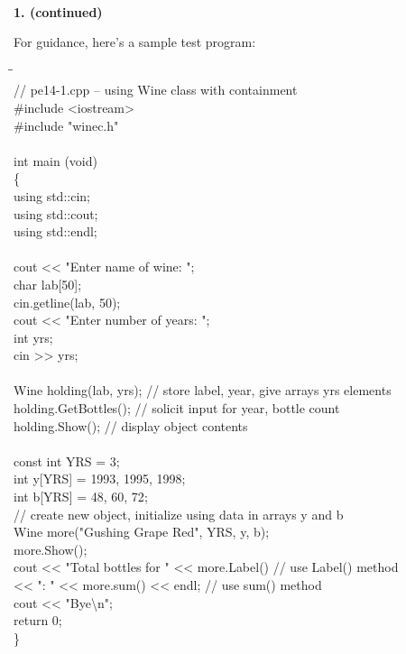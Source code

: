 \documentclass[10 pt]{amsart}
\newlength{\cwidth}
\newenvironment{cpartContinued}[2][\cwidth]
	{%
		\\ %
		\textbf{#2. (continued)}%
		\\
		\phantom{#2. }
		\begin{minipage}[t]{#1}%
		\setlength{\parindent}{0pt}%
		\setlength{\parskip}{2ex}%
	}
	{%
		\end{minipage}%
	}
\newcommand{\tbs}{\textbackslash}
\begin{document}
	\newpage
	\begin{cpartContinued}{1}
		For guidance, here's a sample test program:
		{\ttfamily
			\begin{tabbing}
				\phantom{\qquad}\=\hspace{5cm}\=\hspace{4cm}\= \\
				// pe14-1.cpp -- using Wine class with containment \\
				\#include <iostream> \\
				\#include "winec.h" \\
				\\
				int main (void) \\
				\{
				\+ \\
					using std::cin; \\
					using std::cout; \\
					using std::endl; \\
					\\
					cout << "Enter name of wine: "; \\
					char lab[50]; \\
					cin.getline(lab, 50); \\
					cout << "Enter number of years: "; \\
					int yrs; \\
					cin >> yrs; \\
					\\
					Wine holding(lab, yrs); \> 
						// store label, year, give arrays yrs elements \\
					holding.GetBottles(); \>
						// solicit input for year, bottle count \\
					holding.Show(); \> 
						// display object contents \\
					\\
					const int YRS = 3; \\
					int y[YRS] = {1993, 1995, 1998}; \\
					int b[YRS] = {48, 60, 72}; \\
					// create new object, initialize using data in arrays 
						y and b \\
					Wine more("Gushing Grape Red", YRS, y, b); \\
					more.Show(); \\
					cout << "Total bottles for " << more.Label() \> \> 
						// use Label() method \\
					\phantom{cout} << ": " << more.sum() << endl; \> \> 
						// use sum() method \\
					cout << "Bye\tbs n"; \\
					return 0; \\
				\< \}
			\end{tabbing}
		}
	\end{cpartContinued} 
\end{document}
